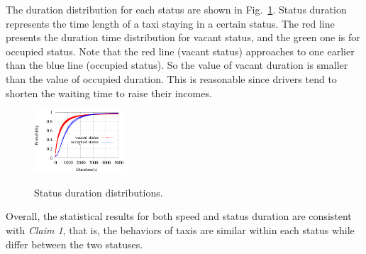 
The duration distribution for each status are shown in Fig.~\ref{figure_duration_for_each_status}. Status duration represents the time length of a taxi staying in a certain status. The red line presents the duration time distribution for vacant status, and the green one is for occupied status. Note that the red line (vacant status) approaches to  one earlier than the blue line (occupied status). So the value of vacant duration is smaller than the value of occupied duration. This is reasonable since drivers tend to shorten the waiting time to raise their incomes.
\begin{figure}[!h]
\centering
\includegraphics[width=0.3\textwidth]{figures/assumption/durationdis.eps}\\
\caption{Status duration distributions.}\label{figure_duration_for_each_status}
\end{figure}

Overall, the statistical results for both speed and status duration are consistent with \emph{Claim 1}, that is, the behaviors of taxis are similar within each status while differ between the two statuses.
